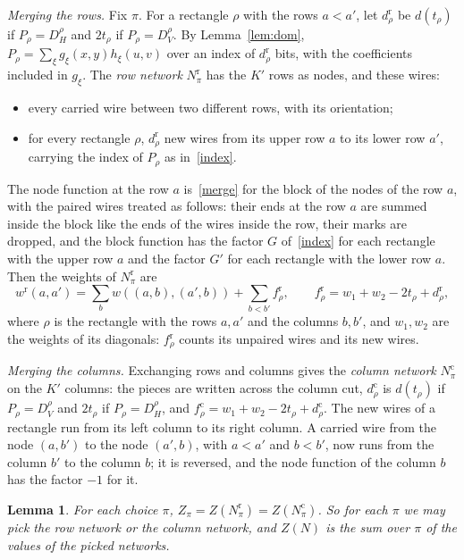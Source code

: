 \documentclass[11pt]{article}
\newtheorem{lemma}[theorem]{Lemma}
\begin{document}
\emph{Merging the rows.} Fix $\pi$. For a rectangle $\rho$ with the rows $a<a'$, let $d^{\mathrm r}_\rho$ be $d(t_\rho)$ if $P_\rho=D_H^\rho$ and $2t_\rho$ if $P_\rho=D_V^\rho$. By Lemma~\ref{lem:dom}, $P_\rho=\sum_\xi g_\xi(x,y)h_\xi(u,v)$ over an index of $d^{\mathrm r}_\rho$ bits, with the coefficients included in $g_\xi$. The \emph{row network} $N^{\mathrm r}_\pi$ has the $K'$ rows as nodes, and these wires:
\begin{itemize}\setlength{\itemsep}{0pt}
\item every carried wire between two different rows, with its orientation;
\item for every rectangle $\rho$, $d^{\mathrm r}_\rho$ new wires from its upper row $a$ to its lower row $a'$, carrying the index of $P_\rho$ as in~\eqref{index}.
\end{itemize}
The node function at the row $a$ is~\eqref{merge} for the block of the nodes of the row $a$, with the paired wires treated as follows: their ends at the row $a$ are summed inside the block like the ends of the wires inside the row, their marks are dropped, and the block function has the factor $G$ of~\eqref{index} for each rectangle with the upper row $a$ and the factor $G'$ for each rectangle with the lower row $a$. Then the weights of $N^{\mathrm r}_\pi$ are
\begin{equation}\label{wrow}
w^{\mathrm r}(a,a')=\sum_bw((a,b),(a',b))+\sum_{b<b'}f^{\mathrm r}_\rho,\qquad f^{\mathrm r}_\rho=w_1+w_2-2t_\rho+d^{\mathrm r}_\rho,
\end{equation}
where $\rho$ is the rectangle with the rows $a,a'$ and the columns $b,b'$, and $w_1,w_2$ are the weights of its diagonals: $f^{\mathrm r}_\rho$ counts its unpaired wires and its new wires.

\emph{Merging the columns.} Exchanging rows and columns gives the \emph{column network} $N^{\mathrm c}_\pi$ on the $K'$ columns: the pieces are written across the column cut, $d^{\mathrm c}_\rho$ is $d(t_\rho)$ if $P_\rho=D_V^\rho$ and $2t_\rho$ if $P_\rho=D_H^\rho$, and $f^{\mathrm c}_\rho=w_1+w_2-2t_\rho+d^{\mathrm c}_\rho$. The new wires of a rectangle run from its left column to its right column. A carried wire from the node $(a,b')$ to the node $(a',b)$, with $a<a'$ and $b<b'$, now runs from the column $b'$ to the column $b$; it is reversed, and the node function of the column $b$ has the factor $-1$ for it.

\begin{lemma}\label{lem:step}
For each choice $\pi$, $Z_\pi=Z(N^{\mathrm r}_\pi)=Z(N^{\mathrm c}_\pi)$. So for each $\pi$ we may pick the row network or the column network, and $Z(N)$ is the sum over $\pi$ of the values of the picked networks.
\end{lemma}
\end{document}
